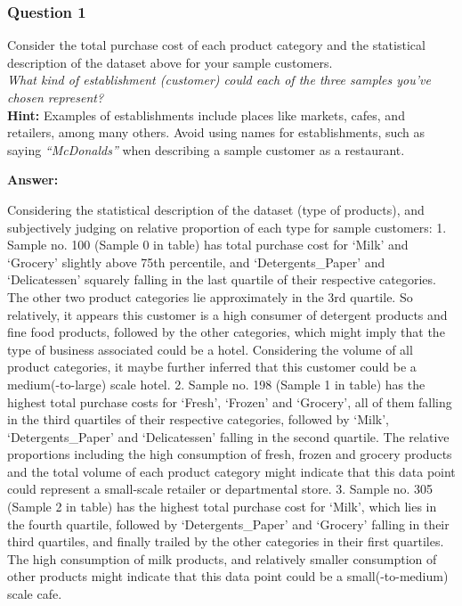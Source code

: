 \documentclass{article}
\begin{document}
    \subsubsection{Question 1}\label{question-1}

Consider the total purchase cost of each product category and the
statistical description of the dataset above for your sample
customers.\\
\emph{What kind of establishment (customer) could each of the three
samples you've chosen represent?}\\
\textbf{Hint:} Examples of establishments include places like markets,
cafes, and retailers, among many others. Avoid using names for
establishments, such as saying \emph{``McDonalds''} when describing a
sample customer as a restaurant.

    \textbf{Answer:}

Considering the statistical description of the dataset (type of
products), and subjectively judging on relative proportion of each type
for sample customers: 1. Sample no. 100 (Sample 0 in table) has total
purchase cost for `Milk' and `Grocery' slightly above 75th percentile,
and `Detergents\_Paper' and `Delicatessen' squarely falling in the last
quartile of their respective categories. The other two product
categories lie approximately in the 3rd quartile. So relatively, it
appears this customer is a high consumer of detergent products and fine
food products, followed by the other categories, which might imply that
the type of business associated could be a hotel. Considering the volume
of all product categories, it maybe further inferred that this customer
could be a medium(-to-large) scale hotel. 2. Sample no. 198 (Sample 1 in
table) has the highest total purchase costs for `Fresh', `Frozen' and
`Grocery', all of them falling in the third quartiles of their
respective categories, followed by `Milk', `Detergents\_Paper' and
`Delicatessen' falling in the second quartile. The relative proportions
including the high consumption of fresh, frozen and grocery products and
the total volume of each product category might indicate that this data
point could represent a small-scale retailer or departmental store. 3.
Sample no. 305 (Sample 2 in table) has the highest total purchase cost
for `Milk', which lies in the fourth quartile, followed by
`Detergents\_Paper' and `Grocery' falling in their third quartiles, and
finally trailed by the other categories in their first quartiles. The
high consumption of milk products, and relatively smaller consumption of
other products might indicate that this data point could be a
small(-to-medium) scale cafe.
\end{document}
